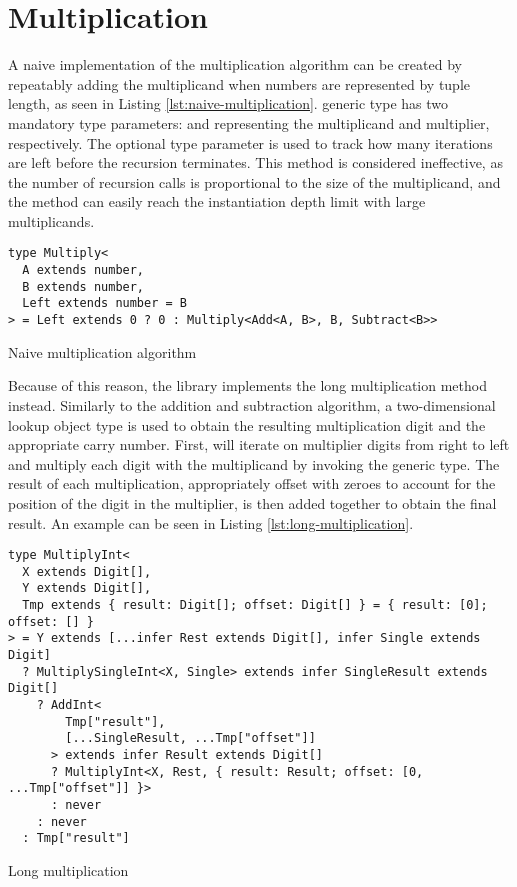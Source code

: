 \section{Multiplication}

A naive implementation of the multiplication algorithm can be created by repeatably adding the multiplicand when numbers are represented by tuple length, as seen in Listing \ref{lst:naive-multiplication}.  generic type has two mandatory type parameters:  and  representing the multiplicand and multiplier, respectively. The optional type parameter  is used to track how many iterations are left before the recursion terminates. This method is considered ineffective, as the number of recursion calls is proportional to the size of the multiplicand, and the method can easily reach the instantiation depth limit with large multiplicands.

\begin{listing}[ht]
  \begin{verbatim}
type Multiply<
  A extends number,
  B extends number,
  Left extends number = B
> = Left extends 0 ? 0 : Multiply<Add<A, B>, B, Subtract<B>>
\end{verbatim}
  \caption{Naive multiplication algorithm}\label{lst:naive-multiplication}
\end{listing}

Because of this reason, the library implements the long multiplication method instead. Similarly to the addition and subtraction algorithm, a two-dimensional lookup object type is used to obtain the resulting multiplication digit and the appropriate carry number. First,  will iterate on multiplier digits from right to left and multiply each digit with the multiplicand by invoking the  generic type. The result of each multiplication, appropriately offset with zeroes to account for the position of the digit in the multiplier, is then added together to obtain the final result. An example can be seen in Listing \ref{lst:long-multiplication}.

\begin{listing}[ht]
  \begin{verbatim}
type MultiplyInt<
  X extends Digit[],
  Y extends Digit[],
  Tmp extends { result: Digit[]; offset: Digit[] } = { result: [0]; offset: [] }
> = Y extends [...infer Rest extends Digit[], infer Single extends Digit]
  ? MultiplySingleInt<X, Single> extends infer SingleResult extends Digit[]
    ? AddInt<
        Tmp["result"],
        [...SingleResult, ...Tmp["offset"]]
      > extends infer Result extends Digit[]
      ? MultiplyInt<X, Rest, { result: Result; offset: [0, ...Tmp["offset"]] }>
      : never
    : never
  : Tmp["result"]
\end{verbatim}
  \caption{Long multiplication}\label{lst:long-multiplication}
\end{listing}

